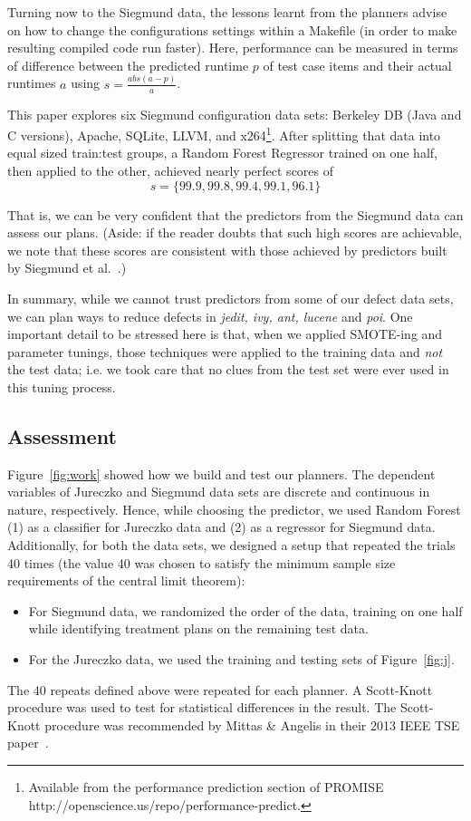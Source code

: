 \documentclass{sig-alternate}
\newcommand{\bi}{\begin{itemize}}
\newcommand{\ei}{\end{itemize}}
\newcommand{\fig}[1]{Figure~\ref{fig:#1}}
\begin{document}
Turning now to the Siegmund data, the lessons learnt from the planners advise on how  to change the configurations settings within a Makefile (in order to make resulting compiled code  run faster). Here, performance can be measured in terms of  difference between the predicted runtime $p$ of test case items and their actual runtimes $a$ using  $s=\frac{abs(a - p)}{a}$.

This paper  explores six Siegmund configuration data sets:  Berkeley DB (Java and C versions), Apache, SQLite, LLVM, and
  x264\footnote{Available from the performance prediction section of PROMISE
  http://openscience.us/repo/performance-predict.}. 
  After splitting that data into equal sized train:test groups, a Random Forest
  Regressor trained on one half, then applied to the other, achieved nearly perfect scores of \[s=\{99.9, 99.8, 99.4, 99.1, 96.1\}\] 
  
That is, we can be very confident that the predictors from the Siegmund data can assess
our plans. (Aside: if the reader doubts that such high scores are achievable, we note that these scores are consistent with those achieved by predictors built by Siegmund et al.~\cite{sven12}.)

In summary, while we cannot trust predictors from some of our defect data sets,
we can plan ways to reduce defects in {\em jedit, ivy, ant, lucene} and {\em poi}.
One important detail to be stressed here is that, when we applied    SMOTE-ing and
parameter tunings, those techniques were applied to the training data and {\em not}
the test data; i.e. we took care that no clues from the test set were ever used in this tuning process.

\subsection{Assessment}
\fig{work} showed how we build and test our planners. The dependent variables of Jureczko and Siegmund data sets are discrete and continuous in nature, respectively. Hence, while choosing the predictor, we used Random Forest (1) as a classifier for Jureczko data and (2) as a regressor for Siegmund data. Additionally, for both the data sets, we designed a setup that repeated the trials 40 times (the value 40 was chosen to satisfy the minimum sample size requirements of the central limit theorem):
\bi
\item For Siegmund data, we randomized the order of the data, training on one half while identifying treatment plans on the remaining test data.
\item For the Jureczko data, we used the training and testing sets of \fig{j}. 
\ei
The 40 repeats defined above were repeated for each planner. A Scott-Knott procedure was used to test for statistical differences in the result. The Scott-Knott procedure was recommended by Mittas \& Angelis in their 2013 IEEE TSE paper~\cite{mittas13}.
\end{document}
